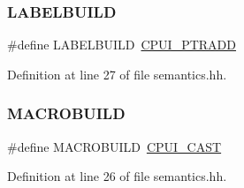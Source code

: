 \mbox{\label{semantics_8hh_ae2d88184cb8fe4e367ba16c958e4a0d1}} 
\subsubsection{\texorpdfstring{LABELBUILD}{LABELBUILD}}
{\footnotesize\ttfamily \#define L\+A\+B\+E\+L\+B\+U\+I\+LD~\mbox{\hyperlink{opcodes_8hh_abeb7dfb0e9e2b3114e240a405d046ea7a148cdebda954b28dbd249f8ad3f32142}{C\+P\+U\+I\+\_\+\+P\+T\+R\+A\+DD}}}



Definition at line 27 of file semantics.\+hh.

\mbox{\label{semantics_8hh_ab3a7173db305a7f55caddd2f765f3475}} 
\subsubsection{\texorpdfstring{MACROBUILD}{MACROBUILD}}
{\footnotesize\ttfamily \#define M\+A\+C\+R\+O\+B\+U\+I\+LD~\mbox{\hyperlink{opcodes_8hh_abeb7dfb0e9e2b3114e240a405d046ea7ab83bb63150022cfa8faab94c521b0a38}{C\+P\+U\+I\+\_\+\+C\+A\+ST}}}



Definition at line 26 of file semantics.\+hh.

